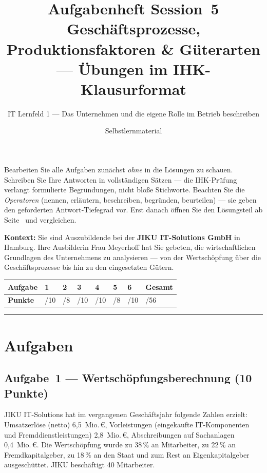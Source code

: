 \documentclass[11pt, a4paper]{article}
\title{\vspace*{-1.5cm}\Huge\bfseries\color{bfwPrimaryDark}Aufgabenheft Session~5\\[0.4em]
  \large\color{bfwInkSoft}\textnormal{Geschäftsprozesse, Produktionsfaktoren \& Güterarten --- Übungen im IHK-Klausurformat}}
\author{\textsf{IT Lernfeld 1 --- Das Unternehmen und die eigene Rolle im Betrieb beschreiben}}
\date{Selbstlernmaterial}
\begin{document}
\maketitle
\thispagestyle{empty}

\begin{merksatz}[title={\bfseries So nutzen Sie dieses Aufgabenheft}]
Bearbeiten Sie alle Aufgaben zunächst \emph{ohne} in die Lösungen zu schauen. Schreiben
Sie Ihre Antworten in vollständigen Sätzen --- die IHK-Prüfung verlangt formulierte
Begründungen, nicht bloße Stichworte. Beachten Sie die \emph{Operatoren} (nennen,
erläutern, beschreiben, begründen, beurteilen) --- sie geben den geforderten
Antwort-Tiefegrad vor. Erst danach öffnen Sie den Lösungsteil ab Seite~\pageref{loesungen}
und vergleichen.
\end{merksatz}

\bigskip

\textbf{Kontext:} Sie sind Auszubildende bei der \textbf{JIKU IT-Solutions GmbH} in Hamburg.
Ihre Ausbilderin Frau Meyerhoff hat Sie gebeten, die wirtschaftlichen Grundlagen des
Unternehmens zu analysieren --- von der Wertschöpfung über die Geschäftsprozesse bis hin
zu den eingesetzten Gütern.

\bigskip

\noindent
\begin{tabular}{|l|l|l|l|l|l|l|l|}
\hline
\textbf{Aufgabe} & 1 & 2 & 3 & 4 & 5 & 6 & \textbf{Gesamt}\\
\hline
\textbf{Punkte} & /10 & /8 & /10 & /10 & /8 & /10 & /56\\
\hline
\end{tabular}

\tableofcontents
\vspace{1em}
\hrule

\section{Aufgaben}

\subsection*{Aufgabe~1 --- Wertschöpfungsberechnung (10 Punkte)}

JIKU IT-Solutions hat im vergangenen Geschäftsjahr folgende Zahlen erzielt:
Umsatzerlöse (netto) 6,5~Mio.\,€, Vorleistungen (eingekaufte IT-Komponenten und
Fremddienstleistungen) 2,8~Mio.\,€, Abschreibungen auf Sachanlagen 0,4~Mio.\,€.
Die Wertschöpfung wurde zu 38\,\% an Mitarbeiter, zu 22\,\% an Fremdkapitalgeber,
zu 18\,\% an den Staat und zum Rest an Eigenkapitalgeber ausgeschüttet.
JIKU beschäftigt 40 Mitarbeiter.
\end{document}
